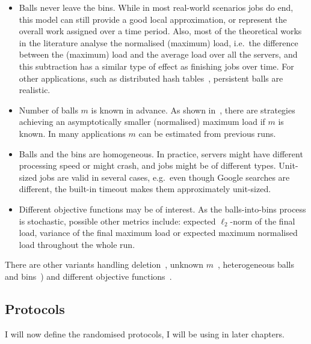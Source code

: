 \begin{itemize}
    \item
    Balls never leave the bins. While in most real-world scenarios jobs do end, this model can still provide a good local approximation, or represent the overall work assigned over a time period. Also, most of the theoretical works in the literature analyse the normalised (maximum) load, i.e.\ the difference between the (maximum) load and the average load over all the servers, and this subtraction has a similar type of effect as finishing jobs over time. For other applications, such as distributed hash tables~\cite{wieder2017ballsintobinslandscape}, persistent balls are realistic. 
    \item
    Number of balls $m$ is known in advance. As shown in~\cite{feldheim2021longtermthinning}, there are strategies achieving an asymptotically smaller (normalised) maximum load if $m$ is known. In many applications $m$ can be estimated from previous runs.
    \item
    Balls and the bins are homogeneous. In practice, servers might have different processing speed or might crash, and jobs might be of different types. Unit-sized jobs are valid in several cases, e.g.\ even though Google searches are different, the built-in timeout makes them approximately unit-sized.
    
    
    \item
    Different objective functions may be of interest. As the balls-into-bins process is stochastic, possible other metrics include: expected $\ell_2$-norm of the final load, variance of the final maximum load or expected maximum normalised load throughout the whole run.
\end{itemize}


There are other variants handling deletion~\cite{azar1999twochoice}, unknown $m$~\cite{feldheim2021longtermthinning}, heterogeneous balls and bins~\cite{berenbrink2008weighted}) and different objective functions~\cite{feldheim2021longtermthinning}.


\subsection{Protocols} \label{protocols}

I will now define the randomised protocols, I will be using in later chapters.


\paragraph{\OneChoice}

